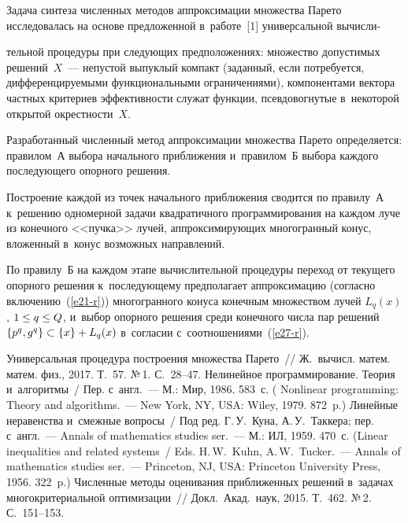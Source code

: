 \begin{multicols}{2}
\vspace*{-3pt}

  Задача синтеза численных методов аппроксимации множества Парето 
исследовалась на основе предложенной в~работе~[1] универсальной 
вычисли-\linebreak\vspace*{-12pt}

\pagebreak

\noindent
тельной процедуры при следующих предположениях: множество 
допустимых решений~$X$~--- непустой выпуклый компакт (заданный, если 
потребуется, дифференцируемыми функциональными ограничениями), 
компонентами вектора частных критериев эффективности служат функции, 
псевдовогнутые в~некоторой открытой окрестности~$X$.
  
  Разработанный численный метод аппроксимации множества Парето 
определяется: правилом~А выбора начального приближения и~правилом~Б 
выбора каждого последующего опорного решения.
  
  Построение каждой из точек начального приближения сводится по 
правилу~А к~решению одномерной задачи квадратичного программирования 
на каждом луче из конечного <<пучка>> лучей, аппроксимирующих 
многогранный конус, вложенный в~конус возможных направлений. 
  
  По правилу~Б на каждом этапе вычислительной процедуры переход от 
текущего опорного решения к~последующему предполагает аппроксимацию 
(согласно включению~(\ref{e21-r})) многогранного конуса конечным 
множеством лучей $L_q(x)$, $1\hm\leq q\hm\leq Q$, и~выбор опорного 
решения среди конечного чис\-ла пар решений $\{ p^q, g^q\}\hm\subset \{x\} 
\hm+ L_q(x)$ в~согласии с~соотношениями~(\ref{e27-r}).

\vspace*{-6pt}

{\small\frenchspacing
 {\baselineskip=10.6pt
 \begin{thebibliography}{9}
 Универсальная процедура построения множества Парето~// 
Ж.~вычисл. матем. матем. физ., 2017. Т.~57. №\,1. С.~28--47.
 Нелинейное программирование. Теория и~алгоритмы~/ Пер. 
с~англ.~--- М.: Мир, 1986. 583~с. (  
Nonlinear programming: Theory and algorithms.~--- New York, NY, USA: 
Wiley, 1979. 872~p.)
Линейные неравенства и~смежные вопросы~/ Под ред. Г.\,У.~Куна, 
А.\,У.~Таккера; пер. с~англ.~--- Annals of mathematics studies ser.~--- М.: ИЛ, 1959. 470~с.
(Linear inequalities and 
related systems~/ Eds. H.\,W.~Kuhn, A.\,W.~Tucker.~--- Annals of mathematics studies ser.~---  Princeton, NJ, USA: Princeton University Press, 1956. 
322~p.)
 Численные методы оценивания приближенных решений в~задачах 
многокритериальной оптимизации~// Докл.\ Акад.\ наук, 2015. Т.~462. №\,2. С.~151--153.

\end{thebibliography}

 }
 }

\end{multicols}


